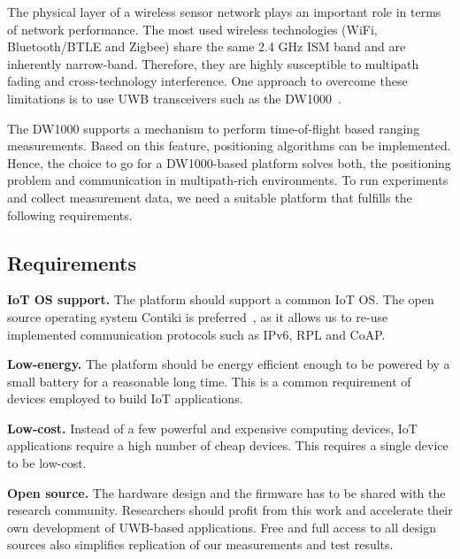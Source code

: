 \documentclass[journal,comsoc]{IEEEtran}
\begin{document}
The physical layer of a wireless sensor network plays an important role in terms of network performance. 
The most used wireless technologies (WiFi, Bluetooth/BTLE and Zigbee) share the same 2.4 GHz ISM band and are inherently narrow-band. 
Therefore, they are highly susceptible to multipath fading and cross-technology interference. 
One approach to overcome these limitations is to use UWB transceivers such as the DW1000~\cite{dw1000ds}. 

The DW1000 supports a mechanism to perform time-of-flight based ranging measurements. 
Based on this feature, positioning algorithms can be implemented. 
Hence, the choice to go for a DW1000-based platform solves both, the positioning problem and communication in multipath-rich environments. 
To run experiments and collect measurement data, we need a suitable platform that fulfills the following requirements. 

\subsection{Requirements}
\label{subsec:requirements}

\vspace*{0.5em}
\noindent\textbf{IoT OS support.} The platform should support a common IoT OS. 
The open source operating system Contiki is preferred~\cite{contikiwebsite}, as it allows us to re-use implemented communication protocols such as IPv6, RPL and CoAP.

\vspace*{0.5em}
\noindent\textbf{Low-energy.} The platform should be energy efficient enough to be powered by a small battery for a reasonable long time. 
This is a common requirement of devices employed to build IoT applications. 

\vspace*{0.5em}
\noindent\textbf{Low-cost.} Instead of a few powerful and expensive computing devices, IoT applications require a high number of cheap devices. 
This requires a single device to be low-cost. 

\vspace*{0.5em}
\noindent\textbf{Open source.} The hardware design and the firmware has to be shared with the research community. 
Researchers should profit from this work and accelerate their own development of UWB-based applications. 
Free and full access to all design sources also simplifies replication of our measurements and test results.
\end{document}
